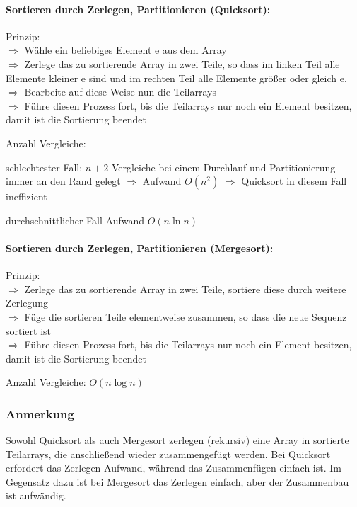 \paragraph{Sortieren durch Zerlegen, Partitionieren (Quicksort):}
Prinzip:\\
$\Rightarrow$ Wähle ein beliebiges Element e aus dem Array\\
$\Rightarrow$ Zerlege das zu sortierende Array in zwei Teile, so dass im linken Teil alle Elemente kleiner e sind und im rechten Teil alle Elemente größer oder gleich e.\\
$\Rightarrow$ Bearbeite auf diese Weise nun die Teilarrays\\
$\Rightarrow$ Führe diesen Prozess fort, bis die Teilarrays nur noch ein Element besitzen, damit ist die Sortierung beendet

Anzahl Vergleiche:
\begin{compactitem}
	\item schlechtester Fall: $n+2$ Vergleiche bei einem Durchlauf und Partitionierung immer an den Rand gelegt $\Rightarrow$ Aufwand $O(n^2)$ $\Rightarrow$ Quicksort in diesem Fall ineffizient
	\item durchschnittlicher Fall Aufwand $O(n \ln n)$
\end{compactitem}

\paragraph{Sortieren durch Zerlegen, Partitionieren (Mergesort):}
Prinzip:\\
$\Rightarrow$ Zerlege das zu sortierende Array in zwei Teile, sortiere diese durch weitere Zerlegung\\
$\Rightarrow$ Füge die sortieren Teile elementweise zusammen, so dass die neue Sequenz sortiert ist\\
$\Rightarrow$ Führe diesen Prozess fort, bis die Teilarrays nur noch ein Element besitzen, damit ist die Sortierung beendet

Anzahl Vergleiche: $O(n \log n)$

\subsubsection{Anmerkung}
Sowohl Quicksort als auch Mergesort zerlegen (rekursiv) eine Array in sortierte Teilarrays, die anschließend wieder zusammengefügt werden. Bei Quicksort erfordert das Zerlegen Aufwand, während das Zusammenfügen einfach ist. Im Gegensatz dazu ist bei Mergesort das Zerlegen einfach, aber der Zusammenbau ist aufwändig.

